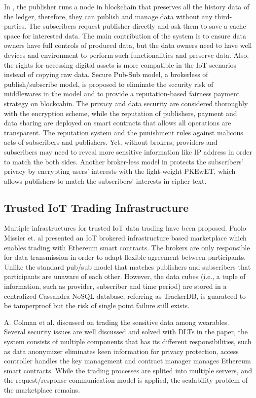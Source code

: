 \documentclass[conference]{IEEEtran}
\begin{document}
In \cite{userCentricData}, the publisher runs a node in blockchain that preserves all the history data of the ledger, therefore, they can publish and manage data without any third-parties. The subscribers request publisher directly and ask them to save a cache space for interested data. The main contribution of the system is to ensure data owners have full controls of produced data, but the data owners need to have well devices and environment to perform such functionalities and preserve data. Also, the rights for accessing digital assets is more compatible in the IoT scenarios instead of copying raw data. Secure Pub-Sub model\cite{SPS}, a brokerless of publish/subscribe model, is proposed to eliminate the security risk of middlewares in the model and to provide a reputation-based fairness payment strategy on blockcahin. The privacy and data security are considered thoroughly with the encryption scheme, while the reputation of publishers, payment and data sharing are deployed on smart contracts that allows all operations are transparent. The reputation system and the punishment rules against malicous acts of subscribers and publishers. Yet, without brokers, providers and subscribers may need to reveal more sensitive information like IP address in order to match the both sides. Another broker-less model in \cite{PrivacyPreservPubSub} protects the subscribers' privacy by encrypting users' interests with the light-weight PKEwET\cite{PKEwET}, which allows publishers to match the subscribers' interests in cipher text. 

\subsection{Trusted IoT Trading Infrastructure}
Multiple infrastructures for trusted IoT data trading have been proposed. Paolo Missier et. al\cite{MindMyValue} presented an IoT brokered infrastructure based marketplace which enables trading with Ethereum smart contracts. The brokers are only responsible for data transmission in order to adapt flexible agreement between participants. Unlike the standard pub/sub model that matches publishers and subscribers that participants are unaware of each other. However, the data cubes (i.e., a tuple of information, such as provider, subscriber and time period) are stored in a centralized Cassandra NoSQL database, referring as TrackerDB, is guarateed to be tamperproof but the risk of single point failure still exists. 

A. Colman et al. \cite{TrustedMarketplaceWearable} discussed on trading the sensitive data among wearables. Several security issues are well discussed and solved with DLTs in the paper, the system consists of multiple components that has its different responsibilities, such as data anonymizer eliminates keen information for privacy protection, access controller handles the key management and contract manager manages Ethereum smart contracts. While the trading processes are splited into multiple servers, and the request/response communication model is applied, the scalability problem of the marketplace remains.
\end{document}
